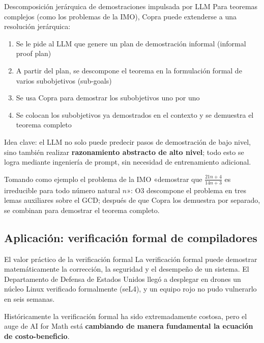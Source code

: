 \documentclass[a4paper]{article}
\begin{document}
\begin{importantbox}{Descomposición jerárquica de demostraciones impulsada por LLM}
Para teoremas complejos (como los problemas de la IMO), Copra puede extenderse a una resolución jerárquica:
\begin{enumerate}
    \item Se le pide al LLM que genere un plan de demostración informal (informal proof plan)
    \item A partir del plan, se descompone el teorema en la formulación formal de varios subobjetivos (sub-goals)
    \item Se usa Copra para demostrar los subobjetivos uno por uno
    \item Se colocan los subobjetivos ya demostrados en el contexto y se demuestra el teorema completo
\end{enumerate}
Idea clave: el LLM no solo puede predecir pasos de demostración de bajo nivel, sino también realizar \textbf{razonamiento abstracto de alto nivel}; todo esto se logra mediante ingeniería de prompt, sin necesidad de entrenamiento adicional.
\end{importantbox}

Tomando como ejemplo el problema de la IMO «demostrar que $\frac{21n+4}{14n+3}$ es irreducible para todo número natural $n$»: O3 descompone el problema en tres lemas auxiliares sobre el GCD; después de que Copra los demuestra por separado, se combinan para demostrar el teorema completo.

\subsection{Aplicación: verificación formal de compiladores}

\begin{knowledgebox}{El valor práctico de la verificación formal}
La verificación formal puede demostrar matemáticamente la corrección, la seguridad y el desempeño de un sistema. El Departamento de Defensa de Estados Unidos llegó a desplegar en drones un núcleo Linux verificado formalmente (seL4), y un equipo rojo no pudo vulnerarlo en seis semanas.

Históricamente la verificación formal ha sido extremadamente costosa, pero el auge de AI for Math está \textbf{cambiando de manera fundamental la ecuación de costo-beneficio}.
\end{knowledgebox}
\end{document}
